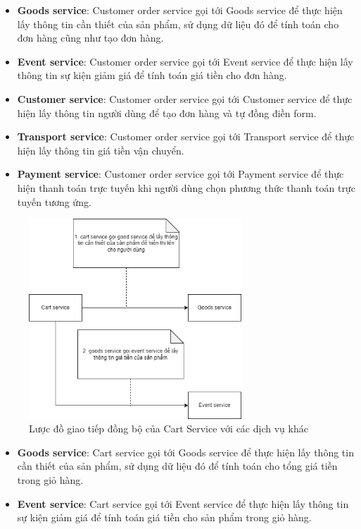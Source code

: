 \begin{itemize}
	\item \textbf{Goods service}: Customer order service gọi tới Goods service để thực hiện lấy thông tin cần thiết của sản phẩm, sử dụng dữ liệu đó để tính toán cho đơn hàng cũng như tạo đơn hàng.
	\item \textbf{Event service}: Customer order service gọi tới Event service để thực hiện lấy thông tin sự kiện giảm giá để tính toán giá tiền cho đơn hàng.
	\item \textbf{Customer service}: Customer order service gọi tới Customer service để thực hiện lấy thông tin người dùng để tạo đơn hàng và tự đồng điền form.
	\item \textbf{Transport service}: Customer order service gọi tới Transport service để thực hiện lấy thông tin giá tiền vận chuyển.
	\item \textbf{Payment service}: Customer order service gọi tới Payment service để thực hiện thanh toán trực tuyến khi người dùng chọn phương thức thanh toán trực tuyến tương ứng.
\end{itemize}


\begin{figure}[!htp]
	\centering
	\includegraphics[width=8cm]{img/Architecture/service/cart-call.png}
	\newline
	\caption{Lược đồ giao tiếp đồng bộ của Cart Service với các dịch vụ khác}
\end{figure}

\begin{itemize}
	\item \textbf{Goods service}: Cart service gọi tới Goods service để thực hiện lấy thông tin cần thiết của sản phẩm, sử dụng dữ liệu đó để tính toán cho tổng giá tiền trong giỏ hàng.
	\item \textbf{Event service}: Cart service gọi tới Event service để thực hiện lấy thông tin sự kiện giảm giá để tính toán giá tiền cho sản phẩm trong giỏ hàng.
\end{itemize}

